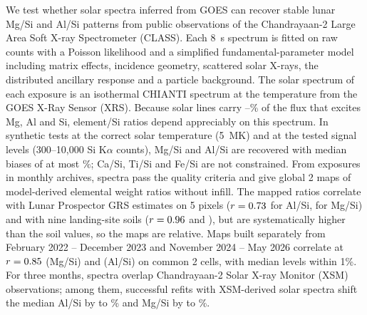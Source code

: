 We test whether solar spectra inferred from GOES can recover stable lunar Mg/Si and Al/Si patterns from public observations of the Chandrayaan-2 Large Area Soft X-ray Spectrometer (CLASS). Each \SI{8}{s} spectrum is fitted on raw counts with a Poisson likelihood and a simplified fundamental-parameter model including matrix effects, incidence geometry, scattered solar X-rays, the distributed ancillary response and a particle background. The solar spectrum of each exposure is an isothermal CHIANTI spectrum at the temperature from the GOES X-Ray Sensor (XRS). Because solar lines carry \LineFracSiLo--\LineFracMgHi\% of the flux that excites Mg, Al and Si, element/Si ratios depend appreciably on this spectrum. In synthetic tests at the correct solar temperature (\SI{5}{MK}) and at the tested signal levels (300--10{,}000 Si K$\alpha$ counts), Mg/Si and Al/Si are recovered with median biases of at most \SynMaxBiasMgAl\%; Ca/Si, Ti/Si and Fe/Si are not constrained. From \NRawFiles{} exposures in \NMonths{} monthly archives, \NMapped{} spectra pass the quality criteria and give global 2\textdegree{} maps of model-derived elemental weight ratios without infill. The mapped ratios correlate with Lunar Prospector GRS estimates on 5\textdegree{} pixels ($r=0.73$ for Al/Si, \GrsMgR{} for Mg/Si) and with nine landing-site soils ($r=0.96$ and \SiteMgTwoR), but are systematically higher than the soil values, so the maps are relative. Maps built separately from February 2022 -- December 2023 and November 2024 -- May 2026 correlate at $r=0.85$ (Mg/Si) and \EpAlTwoR{} (Al/Si) on common 2\textdegree{} cells, with median levels within 1\%. For three months, \XsmNClass{} spectra overlap Chandrayaan-2 Solar X-ray Monitor (XSM) observations; among them, successful refits with XSM-derived solar spectra shift the median Al/Si by \XsmTwoAl{} to \XsmOneAl\% and Mg/Si by \XsmTwoMg{} to \XsmOneMg\%.
